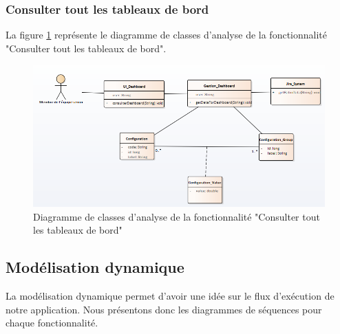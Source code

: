 \subsubsection{Consulter tout les tableaux de bord}
La figure \ref{code62} représente le diagramme de classes d'analyse de la fonctionnalité "Consulter tout les tableaux de bord".
\begin{figure}[H]
  \centering
 \includegraphics[scale=0.69]{figures/diagrams/class/consulteralldashboard_class_diag.png}
 \caption{Diagramme de classes d'analyse de la fonctionnalité "Consulter tout les tableaux de bord"}
 \label{code62}
\end{figure}

\newpage
\subsection{Modélisation dynamique}
La modélisation dynamique permet d'avoir une idée sur le flux d'exécution de notre application. Nous présentons donc les diagrammes de séquences pour chaque fonctionnalité.

